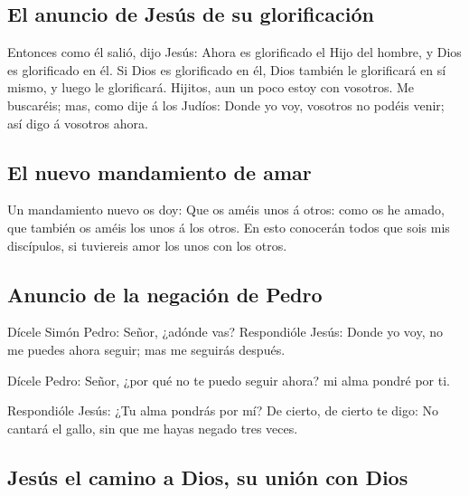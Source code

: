 \hypertarget{el-anuncio-de-jesuxfas-de-su-glorificaciuxf3n}{%
\subsection{El anuncio de Jesús de su
glorificación}\label{el-anuncio-de-jesuxfas-de-su-glorificaciuxf3n}}

 Entonces como él salió, dijo Jesús: Ahora es glorificado
el Hijo del hombre, y Dios es glorificado en él.  Si Dios
es glorificado en él, Dios también le glorificará en sí mismo, y luego
le glorificará.  Hijitos, aun un poco estoy con vosotros.
Me buscaréis; mas, como dije á los Judíos: Donde yo voy, vosotros no
podéis venir; así digo á vosotros ahora.

\hypertarget{el-nuevo-mandamiento-de-amar}{%
\subsection{El nuevo mandamiento de
amar}\label{el-nuevo-mandamiento-de-amar}}

 Un mandamiento nuevo os doy: Que os améis unos á otros:
como os he amado, que también os améis los unos á los otros.
 En esto conocerán todos que sois mis discípulos, si
tuviereis amor los unos con los otros.

\hypertarget{anuncio-de-la-negaciuxf3n-de-pedro}{%
\subsection{Anuncio de la negación de
Pedro}\label{anuncio-de-la-negaciuxf3n-de-pedro}}

 Dícele Simón Pedro: Señor, ¿adónde vas? Respondióle Jesús:
Donde yo voy, no me puedes ahora seguir; mas me seguirás después.

 Dícele Pedro: Señor, ¿por qué no te puedo seguir ahora? mi
alma pondré por ti.

 Respondióle Jesús: ¿Tu alma pondrás por mí? De cierto, de
cierto te digo: No cantará el gallo, sin que me hayas negado tres veces.

\hypertarget{jesuxfas-el-camino-a-dios-su-uniuxf3n-con-dios}{%
\subsection{Jesús el camino a Dios, su unión con
Dios}\label{jesuxfas-el-camino-a-dios-su-uniuxf3n-con-dios}}

